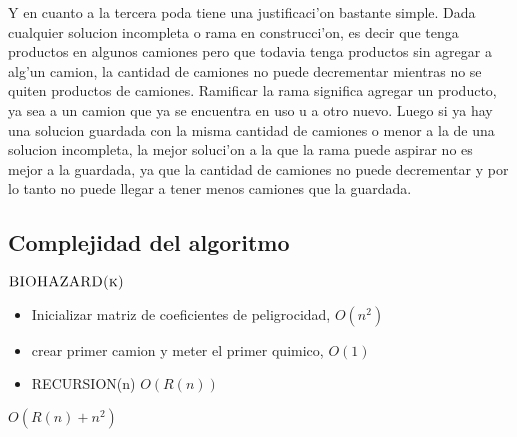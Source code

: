 Y en cuanto a la tercera poda tiene una justificaci'on bastante simple. Dada cualquier solucion incompleta o rama en construcci'on, es decir que tenga productos en algunos camiones pero que todavia tenga productos sin agregar a alg'un camion, la cantidad de camiones no puede decrementar mientras no se quiten productos de camiones. Ramificar la rama significa agregar un producto, ya sea a un camion que ya se encuentra en uso u a otro nuevo. Luego si ya hay una solucion guardada con la misma cantidad de camiones o menor a la de una solucion incompleta, la mejor soluci'on a la que la rama puede aspirar no es mejor a la guardada, ya que la cantidad de camiones no puede decrementar y por lo tanto no puede llegar a tener menos camiones que la guardada.


\subsection{Complejidad del algoritmo}




$\textnormal{\scshape BIOHAZARD(k)}$

\begin{itemize}
	\item Inicializar matriz de coeficientes de peligrocidad,		$O(n^2)$
	\item crear primer camion y meter el primer quimico,		$O(1)$
	\item RECURSION(n)										$O(R(n))$
\end{itemize}		$O(R(n) + n^2 )$ 





